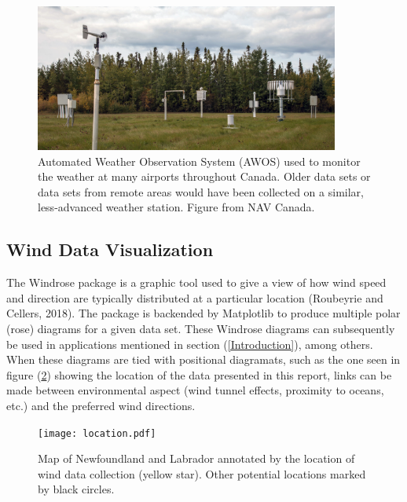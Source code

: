 \documentclass{article}
\begin{document}
\begin{figure}[h!]
\centering
\includegraphics[width=10cm]{Images/AWOS.jpg}
\caption{Automated Weather Observation System (AWOS) used to monitor the weather at many airports throughout Canada. Older data sets or data sets from remote areas would have been collected on a 
similar, less-advanced weather station. Figure from NAV Canada.}
\label{AWOS}
\end{figure}

\subsection{Wind Data Visualization}\label{Wind_data_visualization}

The Windrose package is a graphic tool used to give a view of how wind speed and direction are typically distributed at a particular location (Roubeyrie and Cellers, 2018). The package is backended by 
Matplotlib to produce multiple polar (rose) diagrams for a given data set. These Windrose diagrams can subsequently be used in applications mentioned in section (\ref{Introduction}), among others. When 
these diagrams are tied with positional diagramats, such as the one seen in figure (\ref{location}) showing the location of the data presented in this report, links can be made between environmental 
aspect 
(wind tunnel effects, proximity to oceans, etc.) and the preferred wind directions.

\begin{figure}[h!]                                                                                                                                                                                                 
\centering                                                                                                                                                                                                         
\texttt{[image: location.pdf]}                                                                                                                                                                       
\caption{Map of Newfoundland and Labrador annotated by the location of wind data collection (yellow star). Other potential locations marked by black circles.}                                                                                                              
\label{location}                                                                                                                                                                                                   
\end{figure}
\end{document}
